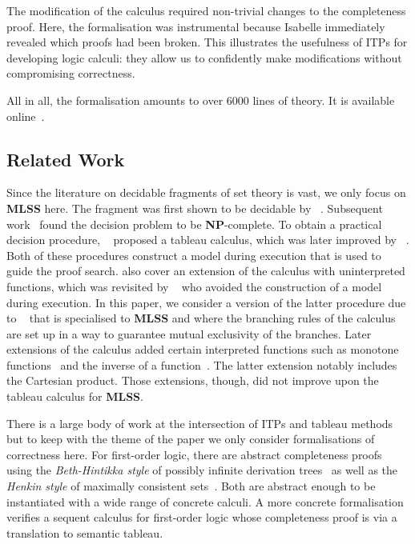 \documentclass[runningheads]{llncs}
\newcommand{\MLSS}{\textbf{MLSS}}
\begin{document}
The modification of the calculus required non-trivial changes to the completeness proof.
Here, the formalisation was instrumental because Isabelle immediately revealed which proofs had been broken.
This illustrates the usefulness of ITPs for developing logic calculi: they allow us to confidently make modifications without compromising correctness. 

All in all, the formalisation amounts to over 6000 lines of theory.
It is available online~\cite{formalisation}.

\subsection{Related Work}
Since the literature on decidable fragments of set theory is vast, we only focus on \MLSS{} here.
The fragment was first shown to be decidable by \citeauthor{mlss_first}~\cite{mlss_first}.
Subsequent work~\cite{mlss_np} found the decision problem to be \textbf{NP}-complete.
To obtain a practical decision procedure, \citeauthor{mlss_first_tableau}~\cite{mlss_first_tableau} proposed a tableau calculus, which was later improved by \citeauthor{tableau_quantifier_free}~\cite{tableau_quantifier_free}.
Both of these procedures construct a model during execution that is used to guide the proof search.
\citeauthor{tableau_quantifier_free} also cover an extension of the calculus with uninterpreted functions, which was revisited by \citeauthor{mlss_quantification}~\cite{mlss_quantification} who avoided the construction of a model during execution.
In this paper, we consider a version of the latter procedure due to \citeauthor{new_fast_tableau}~\cite{new_fast_tableau} that is specialised to \MLSS{} and where the branching rules of the calculus are set up in a way to guarantee mutual exclusivity of the branches.
Later extensions of the calculus added certain interpreted functions such as monotone functions~\cite{mlss_monotone_functions} and the inverse of a function~\cite{mlss_cartesian_map}.
The latter extension notably includes the Cartesian product.
Those extensions, though, did not improve upon the tableau calculus for \MLSS{}.

There is a large body of work at the intersection of ITPs and tableau methods but to keep with the theme of the paper we only consider formalisations of correctness here.
For first-order logic, there are abstract completeness proofs using the \emph{Beth-Hintikka style} of possibly infinite derivation trees~\cite{completeness_coinductive} as well as the \emph{Henkin style} of maximally consistent sets~\cite{synthetic_completeness_afp}.
Both are abstract enough to be instantiated with a wide range of concrete calculi.
A more concrete formalisation~\cite{sequent_first_order} verifies a sequent calculus for first-order logic whose completeness proof is via a translation to semantic tableau.
\end{document}
